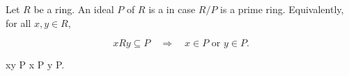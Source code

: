 Let $R$ be a ring. An ideal $P$ of $R$ is a  in case $R/P$ is a prime ring. Equivalently, for all $x, y \in R$,

$$xRy \subseteq P \quad \Longrightarrow \quad x \in P \text{ or } y \in P.$$

 xy \in P \implies x \in P  y \in P.
